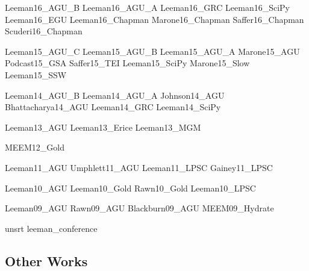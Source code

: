 \documentclass[letterpaper]{article}
\begin{document}
\begingroup
\renewcommand{\section}[2]{}

\nocite{conf}{Leeman16_AGU_B}
\nocite{conf}{Leeman16_AGU_A}
\nocite{conf}{Leeman16_GRC}
\nocite{conf}{Leeman16_SciPy}
\nocite{conf}{Leeman16_EGU}
\nocite{conf}{Leeman16_Chapman}
\nocite{conf}{Marone16_Chapman}
\nocite{conf}{Saffer16_Chapman}
\nocite{conf}{Scuderi16_Chapman}

\nocite{conf}{Leeman15_AGU_C}
\nocite{conf}{Leeman15_AGU_B}
\nocite{conf}{Leeman15_AGU_A}
\nocite{conf}{Marone15_AGU}
\nocite{conf}{Podcast15_GSA}
\nocite{conf}{Saffer15_TEI}
\nocite{conf}{Leeman15_SciPy}
\nocite{conf}{Marone15_Slow}
\nocite{conf}{Leeman15_SSW}

\nocite{conf}{Leeman14_AGU_B}
\nocite{conf}{Leeman14_AGU_A}
\nocite{conf}{Johnson14_AGU}
\nocite{conf}{Bhattacharya14_AGU}
\nocite{conf}{Leeman14_GRC}
\nocite{conf}{Leeman14_SciPy}

\nocite{conf}{Leeman13_AGU}
\nocite{conf}{Leeman13_Erice}
\nocite{conf}{Leeman13_MGM}

\nocite{conf}{MEEM12_Gold}

\nocite{conf}{Leeman11_AGU}
\nocite{conf}{Umphlett11_AGU}
\nocite{conf}{Leeman11_LPSC}
\nocite{conf}{Gainey11_LPSC}

\nocite{conf}{Leeman10_AGU}
\nocite{conf}{Leeman10_Gold}
\nocite{conf}{Rawn10_Gold}
\nocite{conf}{Leeman10_LPSC}

\nocite{conf}{Leeman09_AGU}
\nocite{conf}{Rawn09_AGU}
\nocite{conf}{Blackburn09_AGU}
\nocite{conf}{MEEM09_Hydrate}


{unsrt}
{leeman_conference}{}
\endgroup

\subsection*{Other Works}

\begingroup
\renewcommand{\section}[2]{}
\end{document}
